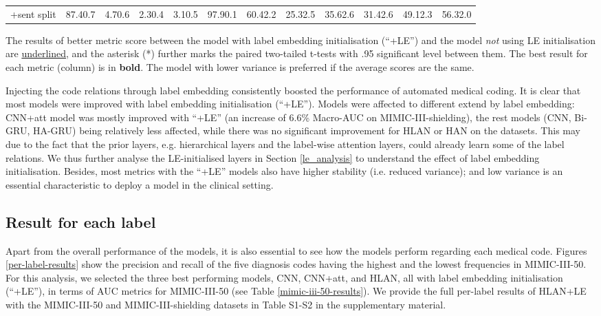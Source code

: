 \documentclass[final,5p,times,twocolumn]{elsarticle}
\begin{document}
\begin{table*}[th]
\begin{threeparttable}
\begin{tabular}{lp{1cm}p{1cm}p{1cm}p{1cm}|p{1cm}p{1cm}p{1cm}p{1cm}p{1cm}p{1cm}|p{1cm}}
+sent split & 87.40.7 & 4.70.6   & 2.30.4 & 3.10.5 & 97.90.1   & 60.42.2  & 25.32.5 & 35.62.6 & 31.42.6 & 49.12.3 & 56.32.0 \\
\cline{1-12}
\end{tabular}
\begin{tablenotes}
\item The results of better metric score between the model with label embedding initialisation (``+LE'') and the model \textit{not} using LE initialisation are \underline{underlined}, and the asterisk (*) further marks the paired two-tailed t-tests with .95 significant level between them. The best result for each metric (column) is in \textbf{bold}. The model with lower variance is preferred if the average scores are the same.
\end{tablenotes}
\end{threeparttable}
\end{table*}

Injecting the code relations through label embedding consistently boosted the performance of automated medical coding. It is clear that most models were improved with label embedding initialisation (``+LE''). Models were affected to different extend by label embedding: CNN+att model was mostly improved with ``+LE'' (an increase of 6.6\% Macro-AUC on MIMIC-III-shielding), the rest models (CNN, Bi-GRU, HA-GRU) being relatively less affected, while there was no significant improvement for HLAN or HAN on the datasets. This may due to the fact that the prior layers, e.g. hierarchical layers and the label-wise attention layers, could already learn some of the label relations. We thus further analyse the LE-initialised layers in Section \ref{le_analysis} to understand the effect of label embedding initialisation. Besides, most metrics with the ``+LE'' models also have higher stability (i.e. reduced variance); and low variance is an essential characteristic to deploy a model in the clinical setting.

\subsection{Result for each label}
Apart from the overall performance of the models, it is also essential to see how the models perform regarding each medical code. Figures \ref{per-label-results} show the precision and recall of the five diagnosis codes having the highest and the lowest frequencies in MIMIC-III-50. For this analysis, we selected the three best performing models, CNN, CNN+att, and HLAN, all with label embedding initialisation (``+LE''), in terms of AUC metrics for MIMIC-III-50 (see Table \ref{mimic-iii-50-results}). We provide the full per-label results of HLAN+LE with the MIMIC-III-50 and MIMIC-III-shielding datasets in Table S1-S2 in the supplementary material.
\end{document}
